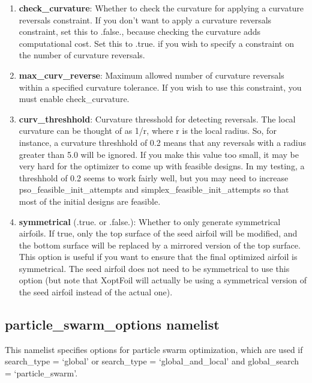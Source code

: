 \documentclass[11pt]{article}
\begin{document}
\begin{enumerate}
{section, which is challenging to build and presents structural problems.  If you don't
want to impose this constraint, just set it to 0.}
\item{\textbf{check\_curvature}: Whether to check the curvature for applying a curvature
reversals constraint.  If you don't want to apply a curvature reversals constraint, set
this to .false., because checking the curvature adds computational cost.  Set this to
.true. if you wish to specify a constraint on the number of curvature reversals.}
\item{\textbf{max\_curv\_reverse}: Maximum allowed number of curvature reversals within a
specified curvature tolerance.  If you wish to use this constraint, you must enable
check\_curvature.}
\item{\textbf{curv\_threshhold}: Curvature thresshold for detecting reversals.  The local
curvature can be thought of as 1/r, where r is the local radius.  So, for instance, a
curvature threshhold of 0.2 means that any reversals with a radius greater than 5.0 will
be ignored.  If you make this value too small, it may be very hard for the optimizer to
come up with feasible designs.  In my testing, a threshhold of 0.2 seems to work fairly
well, but you may need to increase pso\_feasible\_init\_attempts and
simplex\_feasible\_init\_attempts so that most of the initial designs are feasible.}
\item{\textbf{symmetrical} (.true. or .false.): Whether to only generate symmetrical 
airfoils.  If true, only the top surface of the seed airfoil will be modified, and the
bottom surface will be replaced by a mirrored version of the top surface. This option is
useful if you want to ensure that the final optimized airfoil is symmetrical.  The seed 
airfoil does not need
to be symmetrical to use this option (but note that XoptFoil will actually be using a
symmetrical version of the seed airfoil instead of the actual one).}
\end{enumerate}

\subsection{particle\_swarm\_options namelist}

This namelist specifies options for particle swarm optimization, which are used if
search\_type = `global' or search\_type = `global\_and\_local' and global\_search =
`particle\_swarm'.
\end{document}
